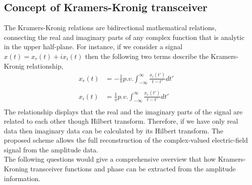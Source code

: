 \subsection{Concept of Kramers-Kronig transceiver}
The Kramers-Kronig relations are bidirectional mathematical relations, connecting the real and imaginary parts of any complex function that is analytic in the upper half-plane. For instance, if we consider a signal $x(t)=x_r(t) + i x_i(t)$ then the following two terms describe the Kramers-Kronig relationship,
\begin{equation*}
\begin{split}
x_{r}(t) &=-\frac{1}{\pi} p.v. \int_{-\infty}^{\infty} \frac{x_{i}(t')}{t-t'} dt' \\ \\
x_{i}(t) &=\frac{1}{\pi} p.v. \int_{-\infty}^{\infty} \frac{x_{r}(t')}{t-t'} dt' \\
\end{split}
\label{KK}
\end{equation*}
The relationship displays that the real and the imaginary parts of the signal are related to each other though Hilbert transform. Therefore, if we have only real data then imaginary data can be calculated by its Hilbert transform. The proposed scheme allows the full reconstruction of the complex-valued electric-field signal from the amplitude data.\\ The following questions would give a comprehensive overview that how Kramers-Kroning transceiver functions and phase can be extracted from the amplitude information.

